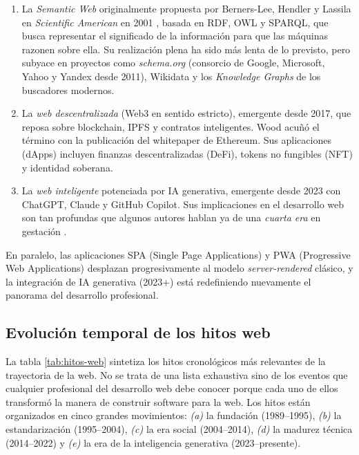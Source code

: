\documentclass[11pt,a4paper,openany]{book}
\begin{document}
\begin{enumerate}
\item La \emph{Semantic Web} originalmente propuesta por Berners-Lee,
Hendler y Lassila en \emph{Scientific American} en 2001
\cite{bernerslee2001semantic}, basada en RDF, OWL y SPARQL, que busca
representar el significado de la información para que las máquinas
razonen sobre ella. Su realización plena ha sido más lenta de lo
previsto, pero subyace en proyectos como \emph{schema.org} (consorcio
de Google, Microsoft, Yahoo y Yandex desde 2011), Wikidata y los
\emph{Knowledge Graphs} de los buscadores modernos.

\item La \emph{web descentralizada} (Web3 en sentido estricto),
emergente desde 2017, que reposa sobre blockchain, IPFS y contratos
inteligentes. Wood \cite{wood2014ethereum} acuñó el término con la
publicación del whitepaper de Ethereum. Sus aplicaciones (dApps)
incluyen finanzas descentralizadas (DeFi), tokens no fungibles (NFT)
y identidad soberana.

\item La \emph{web inteligente} potenciada por IA generativa,
emergente desde 2023 con ChatGPT, Claude y GitHub Copilot. Sus
implicaciones en el desarrollo web son tan profundas que algunos
autores hablan ya de una \emph{cuarta era} en gestación
\cite{kreutzer2024ai}.
\end{enumerate}

En paralelo, las aplicaciones SPA (Single Page Applications) y PWA
(Progressive Web Applications) desplazan progresivamente al modelo
\emph{server-rendered} clásico, y la integración de IA generativa
(2023+) está redefiniendo nuevamente el panorama del desarrollo
profesional.

\subsection{Evolución temporal de los hitos web}

La tabla \ref{tab:hitos-web} sintetiza los hitos cronológicos más
relevantes de la trayectoria de la web. No se trata de una lista
exhaustiva sino de los eventos que cualquier profesional del
desarrollo web debe conocer porque cada uno de ellos transformó la
manera de construir software para la web. Los hitos están organizados
en cinco grandes movimientos: \emph{(a)} la fundación
(1989--1995), \emph{(b)} la estandarización (1995--2004), \emph{(c)}
la era social (2004--2014), \emph{(d)} la madurez técnica
(2014--2022) y \emph{(e)} la era de la inteligencia generativa
(2023--presente).
\end{document}
